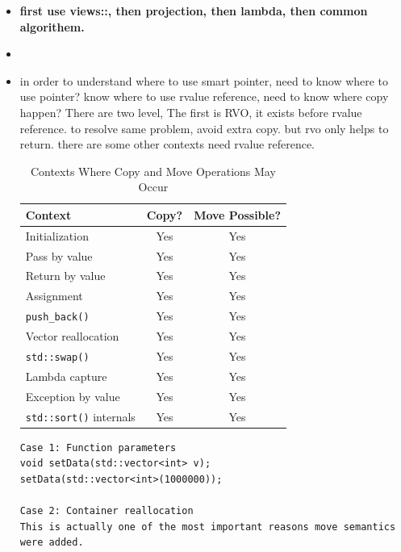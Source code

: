 \documentclass[a4paper,11pt,twoside]{book}
\begin{document}
\begin{itemize}
\begin{lstlisting}
5) Local variables you're done with
std::string s = getString();
std::vector<std::string> v;
v.push_back(std::move(s));
\end{lstlisting}
	
	don't use in return, tempoary or  const objects.


	\item \textbf{first use views::, then projection, then lambda, then common algorithem. }

	\item 

	\item in order to understand where to use smart pointer, need to know where to use pointer?  know where to use rvalue reference, need to know where copy happen?  There are two level, 
	The first is RVO, it exists before rvalue reference. to resolve same problem, avoid extra copy. but rvo only helps to return. there are some other contexts need rvalue reference. 
	
\begin{table}[ht]
\centering
\begin{tabular}{|l|c|c|}
\hline
\textbf{Context} & \textbf{Copy?} & \textbf{Move Possible?} \\
\hline
Initialization          & Yes & Yes \\
\hline
Pass by value           & Yes & Yes \\
\hline
Return by value         & Yes & Yes \\
\hline
Assignment              & Yes & Yes \\
\hline
\texttt{push\_back()}   & Yes & Yes \\
\hline
Vector reallocation     & Yes & Yes \\
\hline
\texttt{std::swap()}    & Yes & Yes \\
\hline
Lambda capture          & Yes & Yes \\
\hline
Exception by value      & Yes & Yes \\
\hline
\texttt{std::sort()} internals & Yes & Yes \\
\hline
\end{tabular}
\caption{Contexts Where Copy and Move Operations May Occur}
\label{tab:copy_move_contexts}
\end{table}

\begin{lstlisting}
Case 1: Function parameters
void setData(std::vector<int> v);
setData(std::vector<int>(1000000));

Case 2: Container reallocation
This is actually one of the most important reasons move semantics were added.


\end{lstlisting}
\end{itemize}
\end{document}
